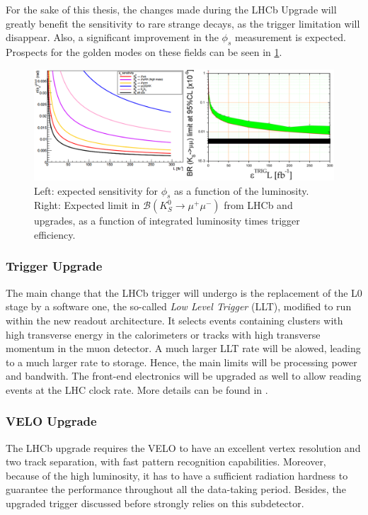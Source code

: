 For the sake of this thesis, the changes made during the LHCb Upgrade will greatly benefit the sensitivity to rare strange decays, as the trigger limitation will disappear. Also, a significant improvement in the $\phi_s$ measurement is expected. Prospects for the golden modes on these fields can be seen in \ref{fig:prospects}.

\begin{figure} [htb!]
\begin{center}
\includegraphics[scale=0.55]{figs/prospects.png}
\caption{Left: expected sensitivity for $\phi_s$ as a function of the luminosity. Right: Expected limit in $\mathcal{B}(K_S^0 \rightarrow \mu^+ \mu^-)$ from LHCb and upgrades, as a function of integrated luminosity times trigger efficiency.\label{fig:prospects} }
\end{center}
\end{figure}

\subsubsection{Trigger Upgrade} 
The main change that the LHCb trigger will undergo is the replacement of the L0 stage by a software one, the so-called \textit{Low Level Trigger} (LLT), modified to run within the new readout architecture. It selects events containing clusters with high transverse energy in the calorimeters or tracks with high transverse momentum in the muon detector. A much larger LLT rate will be alowed, leading to a much larger rate to storage. Hence, the main limits will be processing power and bandwith. The front-end electronics will be upgraded as well to allow reading events at the LHC clock rate. More details can be found in . 

\subsubsection{VELO Upgrade} %
The LHCb upgrade requires the VELO to have an excellent vertex resolution and two track separation, with fast pattern recognition capabilities. Moreover, because of the high luminosity, it has to have a sufficient radiation hardness to guarantee the performance throughout all the data-taking period. Besides, the upgraded trigger discussed before strongly relies on this subdetector. 

